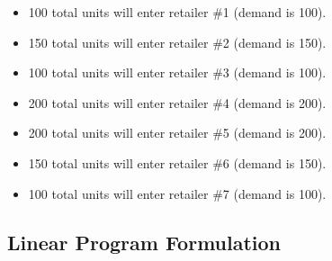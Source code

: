 \documentclass[../report/main.tex]{subfiles}
\begin{document}
\begin{itemize}
	\newline
	\item 100 total units will enter retailer \#1 (demand is 100).
	\item 150 total units will enter retailer \#2 (demand is 150).
	\item 100 total units will enter retailer \#3 (demand is 100).
	\item 200 total units will enter retailer \#4 (demand is 200).
	\item 200 total units will enter retailer \#5 (demand is 200).
	\item 150 total units will enter retailer \#6 (demand is 150).
	\item 100 total units will enter retailer \#7 (demand is 100).
\end{itemize}
\subsection*{Linear Program Formulation}
\end{document}
